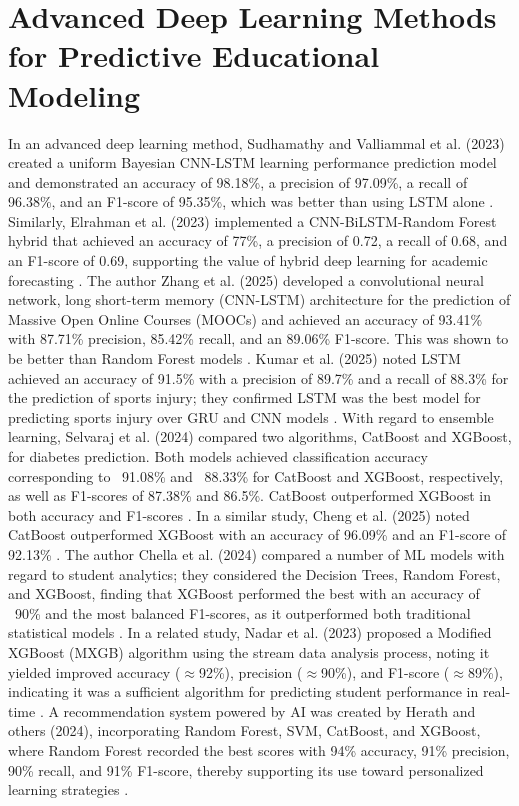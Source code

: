 \documentclass[twocolumn]{svjour3}
\begin{document}
\section{Advanced Deep Learning Methods for Predictive Educational Modeling}
In an advanced deep learning method, Sudhamathy and Valliammal et al. (2023) created a uniform Bayesian CNN-LSTM learning performance prediction model and demonstrated an accuracy of 98.18\%, a precision of 97.09\%, a recall of 96.38\%, and an F1-score of 95.35\%, which was better than using LSTM alone \cite{13}. Similarly, Elrahman et al. (2023) implemented a CNN-BiLSTM-Random Forest hybrid that achieved an accuracy of 77\%, a precision of 0.72, a recall of 0.68, and an F1-score of 0.69, supporting the value of hybrid deep learning for academic forecasting \cite{14}. 
The author Zhang et al. (2025) developed a convolutional neural network, long short-term memory (CNN-LSTM) architecture for the prediction of Massive Open Online Courses (MOOCs) and achieved an accuracy of 93.41\% with 87.71\% precision, 85.42\% recall, and an 89.06\% F1-score. This was shown to be better than Random Forest models \cite{15}. Kumar et al. (2025) noted LSTM achieved an accuracy of 91.5\% with a precision of 89.7\% and a recall of 88.3\% for the prediction of sports injury; they confirmed LSTM was the best model for predicting sports injury over GRU and CNN models \cite{16}. 
With regard to ensemble learning, Selvaraj et al. (2024) compared two algorithms, CatBoost and XGBoost, for diabetes prediction. Both models achieved classification accuracy corresponding to ~91.08\% and ~88.33\% for CatBoost and XGBoost, respectively, as well as F1-scores of 87.38\% and 86.5\%. CatBoost outperformed XGBoost in both accuracy and F1-scores \cite{17}. In a similar study, Cheng et al. (2025) noted CatBoost outperformed XGBoost with an accuracy of 96.09\% and an F1-score of 92.13\% \cite{18}. 
The author Chella et al. (2024) compared a number of ML models with regard to student analytics; they considered the Decision Trees, Random Forest, and XGBoost, finding that XGBoost performed the best with an accuracy of ~90\% and the most balanced F1-scores, as it outperformed both traditional statistical models \cite{19}. 
In a related study, Nadar et al. (2023) proposed a Modified XGBoost (MXGB) algorithm using the stream data analysis process, noting it yielded improved accuracy ($\approx$92\%), precision ($\approx$90\%), and F1-score ($\approx$89\%), indicating it was a sufficient algorithm for predicting student performance in real-time \cite{20}. A recommendation system powered by AI was created by Herath and others (2024), incorporating Random Forest, SVM, CatBoost, and XGBoost, where Random Forest recorded the best scores with 94\% accuracy, 91\% precision, 90\% recall, and 91\% F1-score, thereby supporting its use toward personalized learning strategies \cite{21}. 
\end{document}
